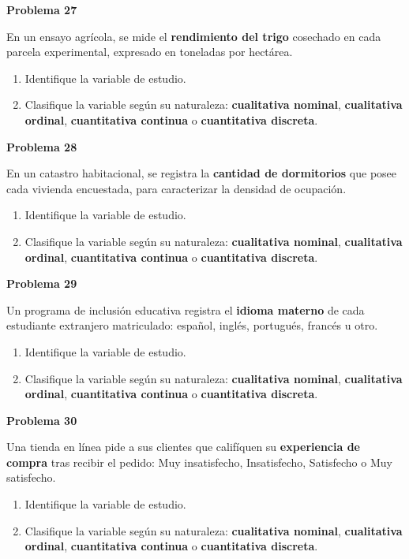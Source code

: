 \documentclass[10pt,letterpaper]{article}
\newcommand{\problema}[1]{%
  \vspace{2pt}%
  \begin{tcolorbox}[
    enhanced,
    colback=white,
    colframe=black,
    arc=0pt,
    boxrule=0pt,
    leftrule=2pt,
    left=6pt, right=6pt,
    top=1pt, bottom=1pt,
  ]
    {\normalsize\bfseries\sffamily #1}
  \end{tcolorbox}%
  \vspace{1pt}%
}
\begin{document}
\problema{Problema 27}
\noindent\sffamily\small En un ensayo agr\'icola, se mide el \textbf{rendimiento del trigo} cosechado en cada parcela experimental, expresado en toneladas por hect\'area.
\begin{enumerate}[leftmargin=1.2cm, label=\textbf{\alph*)}, itemsep=0pt, topsep=2pt]
  \item Identifique la variable de estudio.
  \item Clasifique la variable seg\'un su naturaleza: \textbf{cualitativa nominal}, \textbf{cualitativa ordinal}, \textbf{cuantitativa continua} o \textbf{cuantitativa discreta}.
\end{enumerate}

\problema{Problema 28}
\noindent\sffamily\small En un catastro habitacional, se registra la \textbf{cantidad de dormitorios} que posee cada vivienda encuestada, para caracterizar la densidad de ocupaci\'on.
\begin{enumerate}[leftmargin=1.2cm, label=\textbf{\alph*)}, itemsep=0pt, topsep=2pt]
  \item Identifique la variable de estudio.
  \item Clasifique la variable seg\'un su naturaleza: \textbf{cualitativa nominal}, \textbf{cualitativa ordinal}, \textbf{cuantitativa continua} o \textbf{cuantitativa discreta}.
\end{enumerate}

\problema{Problema 29}
\noindent\sffamily\small Un programa de inclusi\'on educativa registra el \textbf{idioma materno} de cada estudiante extranjero matriculado: espa\~nol, ingl\'es, portugu\'es, franc\'es u otro.
\begin{enumerate}[leftmargin=1.2cm, label=\textbf{\alph*)}, itemsep=0pt, topsep=2pt]
  \item Identifique la variable de estudio.
  \item Clasifique la variable seg\'un su naturaleza: \textbf{cualitativa nominal}, \textbf{cualitativa ordinal}, \textbf{cuantitativa continua} o \textbf{cuantitativa discreta}.
\end{enumerate}

\problema{Problema 30}
\noindent\sffamily\small Una tienda en l\'inea pide a sus clientes que calif\'iquen su \textbf{experiencia de compra} tras recibir el pedido: Muy insatisfecho, Insatisfecho, Satisfecho o Muy satisfecho.
\begin{enumerate}[leftmargin=1.2cm, label=\textbf{\alph*)}, itemsep=0pt, topsep=2pt]
  \item Identifique la variable de estudio.
  \item Clasifique la variable seg\'un su naturaleza: \textbf{cualitativa nominal}, \textbf{cualitativa ordinal}, \textbf{cuantitativa continua} o \textbf{cuantitativa discreta}.
\end{enumerate}
\end{document}
